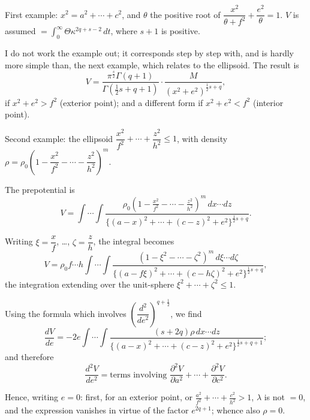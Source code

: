 \documentclass[11pt,a4paper]{book}
\begin{document}
\begin{art}\label{art:97}
First example: $x^2 = a^2 + \cdots + c^2$, and $\theta$ the positive root of $\dfrac{x^2}{\theta + f^2} + \dfrac{e^2}{\theta} = 1$. $V$ is assumed $= \int_0^\infty \Theta \kappa^{2q+s-2} \, dt$, where $s + 1$ is positive.

I do not work the example out; it corresponds step by step with, and is hardly more simple than, the next example, which relates to the ellipsoid. The result is
\[
V = \frac{\pi^{\frac{s}{2}}\Gamma(q+1)}{\Gamma(\frac{1}{2}s+q+1)} \cdot \frac{M}{(x^2 + e^2)^{\frac{1}{2}s+q}},
\]
if $x^2 + e^2 > f^2$ (exterior point); and a different form if $x^2 + e^2 < f^2$ (interior point).
\end{art}

\begin{art}\label{art:98}
Second example: the ellipsoid $\dfrac{x^2}{f^2} + \cdots + \dfrac{z^2}{h^2} \leq 1$, with density $\rho = \rho_0 \left(1 - \dfrac{x^2}{f^2} - \cdots - \dfrac{z^2}{h^2}\right)^m$.

The prepotential is
\[
V = \int \cdots \int \frac{\rho_0 \left(1 - \frac{x^2}{f^2} - \cdots - \frac{z^2}{h^2}\right)^m \, dx \cdots dz}{\{(a-x)^2 + \cdots + (c-z)^2 + e^2\}^{\frac{1}{2}s+q}}.
\]
\end{art}

\begin{art}\label{art:99}
Writing $\xi = \dfrac{x}{f}$, \ldots, $\zeta = \dfrac{z}{h}$, the integral becomes
\[
V = \rho_0 f \cdots h \int \cdots \int \frac{(1 - \xi^2 - \cdots - \zeta^2)^m \, d\xi \cdots d\zeta}{\{(a-f\xi)^2 + \cdots + (c-h\zeta)^2 + e^2\}^{\frac{1}{2}s+q}},
\]
the integration extending over the unit-sphere $\xi^2 + \cdots + \zeta^2 \leq 1$.
\end{art}

\begin{art}\label{art:100}
Using the formula which involves $\left(\dfrac{d^2}{de^2}\right)^{q+\frac{1}{2}}$, we find
\[
\frac{dV}{de} = -2e \int \cdots \int \frac{(s+2q)\rho \, dx \cdots dz}{\{(a-x)^2 + \cdots + (c-z)^2 + e^2\}^{\frac{1}{2}s+q+1}};
\]
and therefore
\[
\frac{d^2V}{de^2} = \text{terms involving } \frac{\partial^2 V}{\partial a^2} + \cdots + \frac{\partial^2 V}{\partial c^2}.
\]

Hence, writing $e = 0$: first, for an exterior point, or $\frac{a^2}{f^2} + \cdots + \frac{c^2}{h^2} > 1$, $\lambda$ is not $= 0$, and the expression vanishes in virtue of the factor $e^{2q+1}$; whence also $\rho = 0$.
\end{art}
\end{document}

